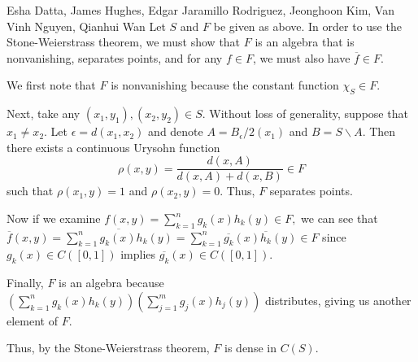 \documentclass[../analysis-main.tex]{subfiles}
\begin{document}

\begin{solution}{Esha Datta, James Hughes, Edgar Jaramillo Rodriguez, Jeonghoon Kim, Van Vinh Nguyen, Qianhui Wan}
        Let $S$ and $F$ be given as above.
        In order to use the Stone-Weierstrass theorem, we must show that $F$ is an algebra that is nonvanishing, separates points, and for any $f\in F$, we must also have $\overline{f}\in F$.

        We first note that $F$ is nonvanishing because the constant function $\chi_S\in F$. 

        Next, take any $(x_1,y_1), (x_2,y_2)\in S$.
        Without loss of generality, suppose that $x_1\neq x_2$.
        Let $\epsilon=d(x_1,x_2)$ and denote $A=B_\epsilon/2(x_1)$ and $B=S\backslash A$.
        Then there exists a continuous Urysohn function  $$\rho(x,y)=\frac{d(x, A)}{d(x,A)+d(x,B)}\in F$$ such that $\rho(x_1,y)=1$ and $\rho(x_2,y)=0$.
        Thus, $F$ separates points.

        Now if we examine $f(x,y)=\sum_{k=1}^n g_k(x)h_k(y)\in F,$ we can see that $\overline{f}(x,y)=\overline{\sum_{k=1}^n g_k(x)h_k(y)}=\sum_{k=1}^n \overline{g_k}(x)\overline{h_k}(y)\in F$ since $g_k(x)\in C([0,1])$ implies $\overline{g_k}(x)\in C([0,1])$.

        Finally, $F$ is an algebra because $\left(\sum_{k=1}^n g_k(x)h_k(y)\right) \left(\sum_{j=1}^m g_j(x)h_j(y)\right)$ distributes, giving us another element of $F$.

        Thus, by the Stone-Weierstrass theorem, $F$ is dense in $C(S)$.
\end{solution}
\end{document}
